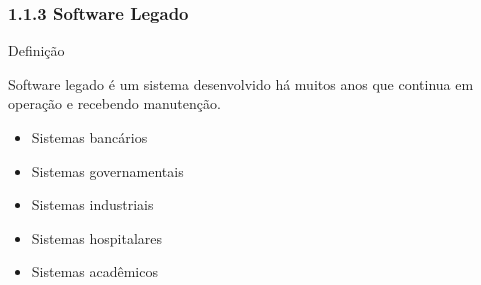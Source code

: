 \documentclass[9pt]{beamer}
\begin{document}
    
    \begin{frame}
    \frametitle{1.1.3 Software Legado}
    
    \begin{block}{Definição}
    
    Software legado é um sistema desenvolvido há muitos anos que
    continua em operação e recebendo manutenção.
    
    \end{block}
    
    \vspace{0.3cm}
    
    \begin{itemize}
    
    \item Sistemas bancários
    
    \item Sistemas governamentais
    
    \item Sistemas industriais
    
    \item Sistemas hospitalares
    
    \item Sistemas acadêmicos
    
    \end{itemize}
    
    \end{frame}
    
\end{document}
